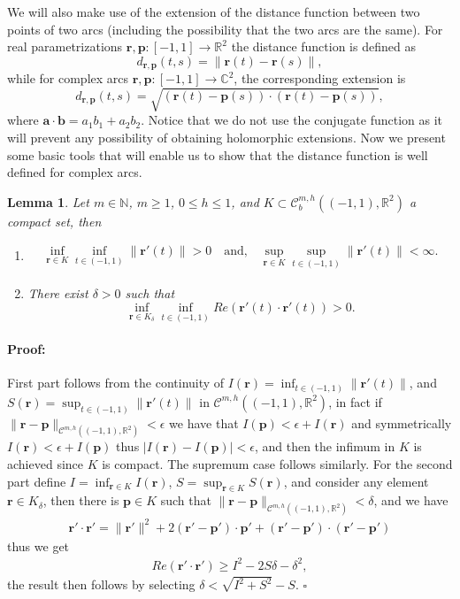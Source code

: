 \documentclass{article}
\newtheorem{lemma}[theorem]{Lemma}
\newenvironment{proof}{\paragraph{Proof:}}{\hfill$\square$}
\newcommand{\ba} {\bm a}
\newcommand{\IC}{{\mathbb C}}
\newcommand{\IN}{{\mathbb N}}
\newcommand{\IR}{{\mathbb R}}
\newcommand{\bp}{{\bm p}}
\newcommand{\cmspaceh}[4]{\mathcal{C}^{#1,#2} \left( #3, #4 \right)}
\newcommand{\rgeoh}[2]{\mathcal{C}_b^{#1,#2}\left( (-1,1), \IR^2 \right)}
\newcommand{\br}{\bm{r}}
\newcommand{\bb}{\bm{b}}
\begin{document}
We will also make use of the extension of the distance function between two points of two arcs (including the possibility that the two arcs are the same).  For real parametrizations $\br, \bp :[-1,1] \rightarrow \IR^2$ the distance function is defined as 
$$d_{\br,\bp}(t,s) = \| \br(t) - \br(s)\|,$$
while for complex arcs $\br, \bp :[-1,1] \rightarrow \IC^2$, the corresponding extension is 
$$d_{\br,\bp}(t,s) =  \sqrt{(\br(t)-\bp(s))\cdot (\br(t)-\bp(s))},$$
where $\ba \cdot \bb  = a_1 b_1 + a_2 b_2$. Notice that we do not use the conjugate function as it will prevent any possibility of obtaining holomorphic extensions.  Now we present some basic tools that will enable us to show that the distance function is well defined for complex arcs. 
\begin{lemma}
\label{lemma:dwelldef}
Let $m \in \IN$, $m\geq1$, $0\leq h \leq 1$, and $K \subset \rgeoh{m}{h}$ a compact set, then 
\begin{enumerate}
\item 
\begin{align*}
\inf_{\br \in K } \inf_{t \in (-1,1)} \| \br'(t) \|>0  \quad \text{and,} \quad  \sup_{\br \in K} \sup_{t \in (-1,1)} \| \br'(t)\| < \infty.
\end{align*}
\item 
There exist $\delta >0 $ such that  
$$ 
\inf_{\br \in K_\delta} \inf_{t \in (-1,1)}Re (\br'(t) \cdot \br'(t)) > 0 .$$
\end{enumerate}
\end{lemma}
\begin{proof}
First part follows from the continuity of $I(\br) = \inf_{t \in (-1,1)} \| \br'(t)\|$, and $S(\br) = \sup_{t \in (-1,1)} \| \br'(t)\|$ in $\cmspaceh{m}{h}{(-1,1)}{\IR^2}$, in fact if $\| \br -\bp \|_{\cmspaceh{m}{h}{(-1,1)}{\IR^2}}< \epsilon$ we have that 
$I(\bp)  < \epsilon + I(\br)$
and symmetrically 
$
I(\br)  < \epsilon + I(\bp)
$
thus $|I(\br) - I(\bp)| < \epsilon$, and then the infimum in $K$ is achieved since $K$ is compact. The supremum case follows similarly. For the second part define $I = \inf_{\br \in K } I(\br)$, $S =\sup_{\br \in K } S(\br)$, and consider any element $\br \in K_\delta$, then there is $\bp \in K$ such that $\| \br -\bp \|_{\cmspaceh{m}{h}{(-1,1)}{\IR^2}} < \delta$, and we have 
\begin{align*}
\br' \cdot \br' = \|\br'\|^2+ 2(\br' -\bp')\cdot \bp' +(\br'-\bp')\cdot(\br'-\bp') 
\end{align*}
thus we get
\begin{align*}
Re(\br' \cdot \br') \geq I^2 - 2S\delta -\delta^2, \end{align*}
the result then follows by selecting $\delta < \sqrt{I^2+S^2}-S$.
\end{proof} 
\end{document}
